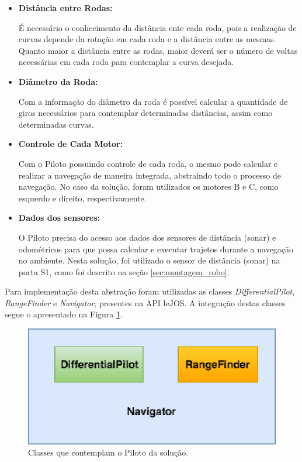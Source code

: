 	\begin{itemize}
		\item \textbf{Distância entre Rodas:}

			É necessário o conhecimento da distância ente cada roda, pois a realização de curvas depende da rotação em cada roda e a distância entre
			as mesmas. Quanto maior a distância entre as rodas, maior deverá ser o número de voltas necessárias em cada roda para contemplar a curva desejada.

			\item \textbf{Diâmetro da Roda:}

			Com a informação do diâmetro da roda é possível calcular a quantidade de giros necessários para contemplar determinadas distâncias, assim
			como determinadas curvas.

			\item \textbf{Controle de Cada Motor:}

			Com o Piloto possuindo controle de cada roda, o mesmo pode calcular e realizar a navegação de maneira integrada, abstraindo todo o
			processo de navegação. No caso da solução, foram utilizados os motores B e C, como esquerdo e direito, respectivamente.

			\item \textbf{Dados dos sensores:}

			O Piloto precisa do acesso aos dados dos sensores de distância (sonar) e odométricos para que possa calcular e executar trajetos
			durante a navegação no ambiente. Nesta solução, foi utilizado o sensor de distância (sonar) na porta S1, como foi descrito na seção \ref{sec:montagem_robo}.

	\end{itemize}

	Para implementação desta abstração foram utilizadas as classes \textit{DifferentialPilot}, \textit{RangeFinder} e \textit{Navigator},
	presentes na API leJOS. A integração destas classes segue o apresentado na Figura \ref{img:classes_navegacao}.

	\begin{figure}[H]
		\centering
		\includegraphics[scale=0.8]{figuras/classes_nav.eps}
		\caption[Classes Piloto]{Classes que contemplam o Piloto da solução.}
		\label{img:classes_navegacao}
	\end{figure}

